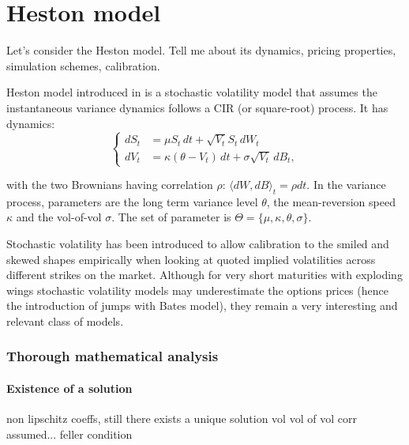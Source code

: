 \section{Heston model}

\begin{tcolorbox}[width=\linewidth, sharp corners=all, colback=white!95!black]
    Let's consider the Heston model. Tell me about its dynamics, pricing properties, simulation schemes, calibration.

\end{tcolorbox}

Heston model introduced in \cite{heston1993closed} is a stochastic volatility model that assumes the instantaneous variance dynamics follows a CIR (or square-root) process. It has dynamics:
\begin{equation*}
    \left\{
    \begin{aligned}
        dS_t &= \mu S_t \, dt + \sqrt{V_t}S_t \, dW_t \\
        dV_t &= \kappa (\theta - V_t) \, dt + \sigma \sqrt{V_t} \, dB_t,
    \end{aligned}
    \right.
\end{equation*}

with the two Brownians having correlation $\rho$: $\langle dW, dB \rangle_t = \rho dt.$ In the variance process, parameters are the long term variance level $\theta$, the mean-reversion speed $\kappa$  and the vol-of-vol $\sigma$. The set of parameter is $\Theta = \{\mu, \kappa, \theta, \sigma\}$.

Stochastic volatility has been introduced to allow calibration to the smiled and skewed shapes empirically when looking at quoted implied volatilities across different strikes on the market. Although for very short maturities with exploding wings stochastic volatility models may underestimate the options prices (hence the introduction of jumps with Bates model), they remain a very interesting and relevant class of models.

\subsubsection*{Thorough mathematical analysis}

\paragraph*{Existence of a solution}
non lipschitz coeffs, still there exists a unique solution
vol vol of vol corr assumed... 
feller condition

